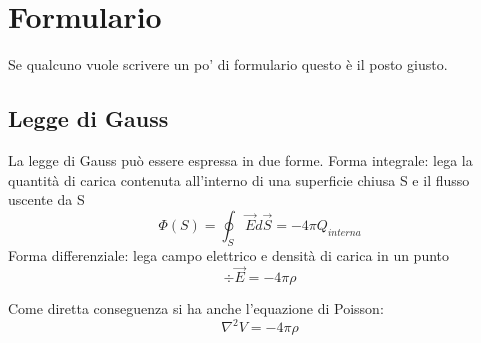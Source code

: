\documentclass[../main.tex]{subfiles}
\begin{document}
\section{Formulario}
\setcounter{equation}{0}
\renewcommand{\theequation}{F.\arabic{equation}}

Se qualcuno vuole scrivere un po' di formulario questo è il posto giusto.
\subsection{Legge di Gauss}\label{Gauss}
La legge di Gauss pu\`o essere espressa in due forme.\newline
Forma integrale: lega la quantit\`a di carica contenuta all'interno di una superficie chiusa S e il flusso uscente da S
\begin{equation}
	\label{GaussIntegrale}
	\Phi(S)= \oint_S \vec E d\vec S=-4\pi Q_{interna}
\end{equation}
Forma differenziale: lega campo elettrico e densit\`a di carica in un punto 
\begin{equation}
	\label{GaussDifferenziale}
	\div \vec E=-4\pi\rho
\end{equation}

Come diretta conseguenza si ha anche l'equazione di Poisson:
\begin{equation}
	\label{Poisson}
	\nabla^2V= -4\pi \rho
\end{equation}
\end{document}
